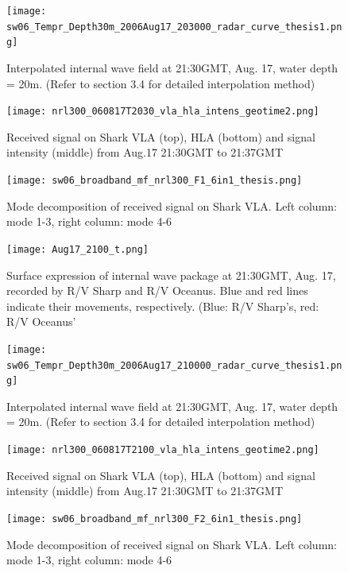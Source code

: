 \begin{figure}[h]
  \centering
  \texttt{[image: sw06\_Tempr\_Depth30m\_2006Aug17\_203000\_radar\_curve\_thesis1.png]}
  \caption{Interpolated internal wave field at 21:30GMT, Aug. 17, water depth = 20m. (Refer to section 3.4 for detailed interpolation method)}\label{fig:r2130_i}
\end{figure}

\begin{figure}[h]
  \centering
  \texttt{[image: nrl300\_060817T2030\_vla\_hla\_intens\_geotime2.png]}
  \caption{Received signal on Shark VLA (top), HLA (bottom) and signal intensity (middle) from Aug.17 21:30GMT to 21:37GMT }\label{fig:a2130}
\end{figure}

\begin{figure}[h]
  \centering
  \texttt{[image: sw06\_broadband\_mf\_nrl300\_F1\_6in1\_thesis.png]}
  \caption{Mode decomposition of received signal on Shark VLA. 
    Left column: mode 1-3, right column: mode 4-6 }\label{fig:m2130}
\end{figure}



\begin{figure}[h]
  \centering
  \texttt{[image: Aug17\_2100\_t.png]}
  \caption{Surface expression of internal wave package at 21:30GMT, Aug. 17, recorded by R/V Sharp and R/V Oceanus. Blue and red lines indicate their movements, respectively. (Blue: R/V Sharp's, red: R/V Oceanus'}\label{fig:r2130_r}
\end{figure}

\begin{figure}[h]
  \centering
  \texttt{[image: sw06\_Tempr\_Depth30m\_2006Aug17\_210000\_radar\_curve\_thesis1.png]}
  \caption{Interpolated internal wave field at 21:30GMT, Aug. 17, water depth = 20m. (Refer to section 3.4 for detailed interpolation method)}\label{fig:r2130_i}
\end{figure}

\begin{figure}[h]
  \centering
  \texttt{[image: nrl300\_060817T2100\_vla\_hla\_intens\_geotime2.png]}
  \caption{Received signal on Shark VLA (top), HLA (bottom) and signal intensity (middle) from Aug.17 21:30GMT to 21:37GMT }\label{fig:a2130}
\end{figure}

\begin{figure}[h]
  \centering
  \texttt{[image: sw06\_broadband\_mf\_nrl300\_F2\_6in1\_thesis.png]}
  \caption{Mode decomposition of received signal on Shark VLA. 
    Left column: mode 1-3, right column: mode 4-6 }\label{fig:m2130}
\end{figure}



